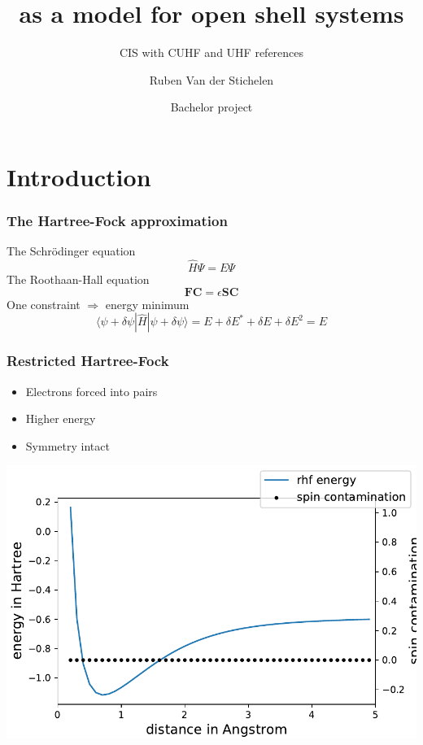 \documentclass[aspectratio=169]{beamer}
\title{\ce{H3} as a model for open shell systems}
\subtitle{CIS with CUHF and UHF references}
\date[ISBT 2018]{Bachelor project}
\author[DB]{Ruben Van der Stichelen}
\begin{document}
\logoframe

\titleframe

\section{Introduction}

\begin{frame}
    \frametitle{The Hartree-Fock approximation}
The Schrödinger equation
    \begin{equation}
        \hat{H}\Psi = E\Psi
    \end{equation}
The Roothaan-Hall equation
\begin{equation}
    \mathbf{FC} = \epsilon \mathbf{SC}
\end{equation}
One constraint $\Longrightarrow$ energy minimum
    \begin{equation}
        \langle \psi + \delta\psi | \hat{H} | \psi + \delta\psi \rangle = E + \delta E^* + \delta E + \delta E^2 = E
    \end{equation}

\end{frame}

\begin{frame}
    \frametitle{Restricted Hartree-Fock}
    \begin{itemize}
        \item Electrons forced into pairs
        \item Higher energy
        \item Symmetry intact
    \end{itemize}
    \begin{minipage}[b]{0.6\linewidth}
        \includegraphics[width=\linewidth]{./figures/rhf.pdf}
    \end{minipage}

\end{frame}
\end{document}
